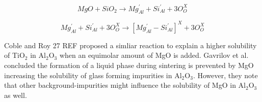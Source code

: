 \begin{equation}
\label{Ch1-eq: eq1}
MgO + SiO_{2} \rightarrow Mg_{Al}^{'} + Si_{Al}^{'} + 3O_{O}^{X}
\end{equation}

\begin{equation}
\label{Ch1-eq: eq1}
Mg_{Al}^{'} + Si_{Al}^{'} + 3O_{O}^{X} \rightarrow \left[ Mg_{Al}^{'} - Si_{Al}^{'} \right]^{X} + 3O_{O}^{X}
\end{equation}

Coble and Roy 27 REF proposed a simliar reaction to explain a higher solubility of TiO$_{2}$ in Al$_{2}$O$_{3}$ when an equimolar amount of MgO is added. Gavrilov et al. \cite{Gavrilov1999} concluded the formation of a liquid phase during sintering is prevented by MgO increasing the solubility of glass forming impurities in Al$_{2}$O$_{3}$. However, they note that other background-impurities might influence the solubility of MgO in Al$_{2}$O$_{3}$ as well.


